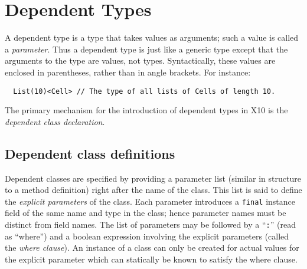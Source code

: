 \documentclass{article}
\def\Xten{{\sf X10}}
\begin{document}
\section{Dependent Types}
A dependent type is a type that takes values as arguments; such a
value is called a {\em parameter}. Thus a dependent type is just like
a generic type except that the arguments to the type are values, not
types. Syntactically, these values are enclosed in parentheses, rather
than in angle brackets. For instance:

{\footnotesize
\begin{verbatim}
  List(10)<Cell> // The type of all lists of Cells of length 10.
\end{verbatim}}

The primary mechanism for the introduction of dependent types in
\Xten{} is the {\em dependent class declaration}.  


\subsection{Dependent class definitions}

Dependent classes are specified by providing a parameter list (similar
in structure to a method definition) right after the name of the
class. This list is said to define the {\em explicit parameters} of
the class.  Each parameter introduces a {\tt final} instance field of
the same name and type in the class; hence parameter names must be
distinct from field names. The list of parameters may be followed by a
``{\tt :}'' (read as ``where'') and a boolean expression involving the
explicit parameters (called the {\em where clause}). An instance of a
class can only be created for actual values for the explicit parameter
which can statically be known to satisfy the where clause. 
\end{document}
